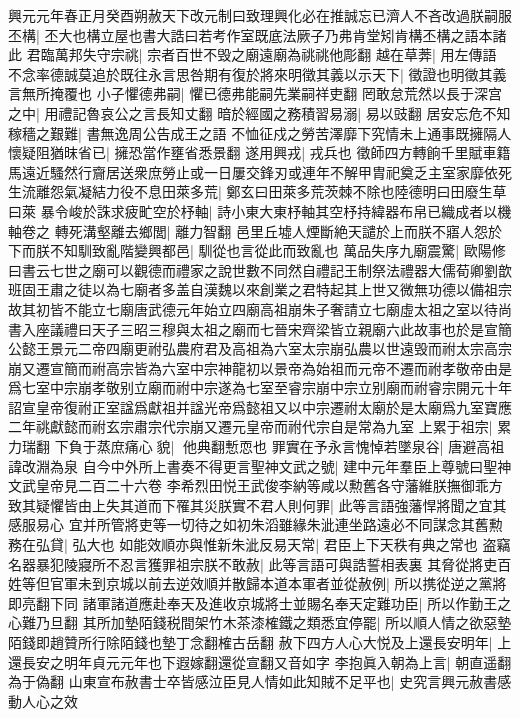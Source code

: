 興元元年春正月癸酉朔赦天下改元制曰致理興化必在推誠忘已濟人不吝改過朕嗣服丕構|{
	丕大也構立屋也書大誥曰若考作室既底法厥子乃弗肯堂矧肯構丕構之語本諸此}
君臨萬邦失守宗祧|{
	宗者百世不毁之廟遠廟為祧祧他彫翻}
越在草莾|{
	用左傳語}
不念率德誠莫追於既往永言思咎期有復於將來明徵其義以示天下|{
	徵證也明徵其義言無所掩覆也}
小子懼德弗嗣|{
	懼已德弗能嗣先業嗣祥吏翻}
罔敢怠荒然以長于深宫之中|{
	用禮記魯哀公之言長知丈翻}
暗於經國之務積習易溺|{
	易以豉翻}
居安忘危不知稼穡之艱難|{
	書無逸周公告成王之語}
不恤征戍之勞苦澤靡下究情未上通事既擁隔人懷疑阻猶昩省已|{
	擁恐當作壅省悉景翻}
遂用興戎|{
	戎兵也}
徵師四方轉餉千里賦車籍馬遠近騷然行齎居送衆庶勞止或一日屢交鋒刃或連年不解甲胄祀奠乏主室家靡依死生流離怨氣凝結力役不息田萊多荒|{
	鄭玄曰田萊多荒茨棘不除也陸德明曰田廢生草曰萊}
暴令峻於誅求疲甿空於杼軸|{
	詩小東大東杼軸其空杼持緯器布帛已織成者以機軸卷之}
轉死溝壑離去鄉閭|{
	離力智翻}
邑里丘墟人煙斷絶天譴於上而朕不寤人怨於下而朕不知馴致亂階變興都邑|{
	馴從也言從此而致亂也}
萬品失序九廟震驚|{
	歐陽修曰書云七世之廟可以觀德而禮家之說世數不同然自禮記王制祭法禮器大儒荀卿劉歆班固王肅之徒以為七廟者多盖自漢魏以來創業之君特起其上世又微無功德以備祖宗故其初皆不能立七廟唐武德元年始立四廟高祖崩朱子奢請立七廟虛太祖之室以待尚書入座議禮曰天子三昭三穆與太祖之廟而七晉宋齊梁皆立親廟六此故事也於是宣簡公懿王景元二帝四廟更祔弘農府君及高祖為六室太宗崩弘農以世遠毁而祔太宗高宗崩又遷宣簡而祔高宗皆為六室中宗神龍初以景帝為始祖而元帝不遷而祔孝敬帝由是爲七室中宗崩孝敬别立廟而祔中宗遂為七室至睿宗崩中宗立别廟而祔睿宗開元十年詔宣皇帝復祔正室諡爲獻祖并諡光帝爲懿祖又以中宗遷祔太廟於是太廟爲九室寶應二年祧獻懿而祔玄宗肅宗代宗崩又遷元皇帝而祔代宗自是常為九室}
上累于祖宗|{
	累力瑞翻}
下負于蒸庶痛心貌|{
	他典翻慙恧也}
罪實在予永言愧悼若墜泉谷|{
	唐避高祖諱改淵為泉}
自今中外所上書奏不得更言聖神文武之號|{
	建中元年羣臣上尊號曰聖神文武皇帝見二百二十六卷}
李希烈田悦王武俊李納等咸以勲舊各守藩維朕撫御乖方致其疑懼皆由上失其道而下罹其災朕實不君人則何罪|{
	此等言語強藩悍將聞之宜其感服易心}
宜并所管將吏等一切待之如初朱滔雖緣朱泚連坐路遠必不同謀念其舊勲務在弘貸|{
	弘大也}
如能效順亦與惟新朱泚反易天常|{
	君臣上下天秩有典之常也}
盗竊名器暴犯陵寢所不忍言獲罪祖宗朕不敢赦|{
	此等言語可與誥誓相表裏}
其脅從將吏百姓等但官軍未到京城以前去逆效順并散歸本道本軍者並從赦例|{
	所以携從逆之黨將即亮翻下同}
諸軍諸道應赴奉天及進收京城將士並賜名奉天定難功臣|{
	所以作勤王之心難乃旦翻}
其所加墊陌錢税間架竹木茶漆榷鐵之類悉宜停罷|{
	所以順人情之欲惡墊陌錢即趙贊所行除陌錢也墊丁念翻榷古岳翻}
赦下四方人心大悦及上還長安明年|{
	上還長安之明年貞元元年也下遐嫁翻還從宣翻又音如字}
李抱眞入朝為上言|{
	朝直遥翻為于偽翻}
山東宣布赦書士卒皆感泣臣見人情如此知賊不足平也|{
	史究言興元赦書感動人心之效}
